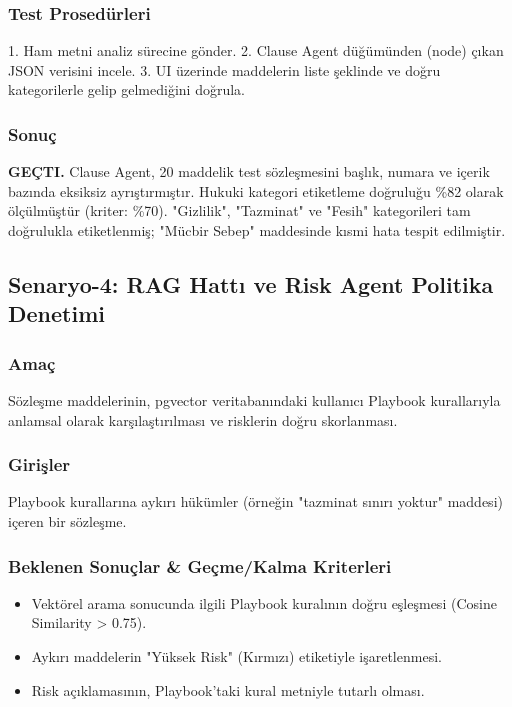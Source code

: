 \documentclass[12pt,a4paper]{article}
\begin{document}
\subsubsection{Test Prosedürleri}
1. Ham metni analiz sürecine gönder. 
2. Clause Agent düğümünden (node) çıkan JSON verisini incele. 
3. UI üzerinde maddelerin liste şeklinde ve doğru kategorilerle gelip gelmediğini doğrula.

\subsubsection{Sonuç}
\textbf{GEÇTI.} Clause Agent, 20 maddelik test sözleşmesini başlık, numara ve içerik bazında eksiksiz ayrıştırmıştır. Hukuki kategori etiketleme doğruluğu \%82 olarak ölçülmüştür (kriter: \%70). "Gizlilik", "Tazminat" ve "Fesih" kategorileri tam doğrulukla etiketlenmiş; "Mücbir Sebep" maddesinde kısmi hata tespit edilmiştir.

\subsection{Senaryo-4: RAG Hattı ve Risk Agent Politika Denetimi}
\subsubsection{Amaç}
Sözleşme maddelerinin, pgvector veritabanındaki kullanıcı Playbook kurallarıyla anlamsal olarak karşılaştırılması ve risklerin doğru skorlanması.

\subsubsection{Girişler}
Playbook kurallarına aykırı hükümler (örneğin "tazminat sınırı yoktur" maddesi) içeren bir sözleşme.

\subsubsection{Beklenen Sonuçlar \& Geçme/Kalma Kriterleri}
\begin{itemize}
    \item Vektörel arama sonucunda ilgili Playbook kuralının doğru eşleşmesi (Cosine Similarity > 0.75).
    \item Aykırı maddelerin "Yüksek Risk" (Kırmızı) etiketiyle işaretlenmesi.
    \item Risk açıklamasının, Playbook'taki kural metniyle tutarlı olması.
\end{itemize}
\end{document}
